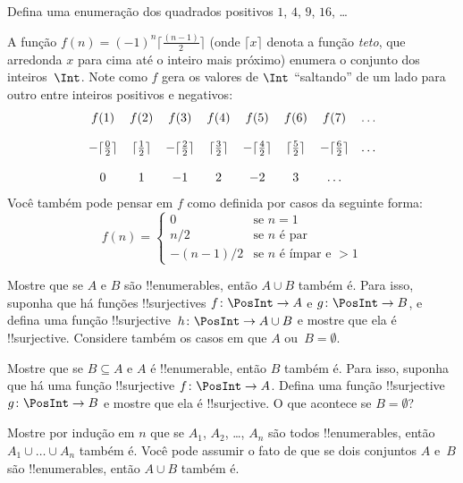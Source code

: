 \documentclass[../../../include/open-logic-section]{subfiles}
\begin{document}
\begin{prob}
Defina uma enumeração dos quadrados positivos $1$, $4$, $9$, $16$, \dots
\end{prob}

\begin{ex}
A função $f(n) = (-1)^{n} \lceil \frac{(n-1)}{2}\rceil$ (onde
$\lceil x \rceil$ denota a função \emph{teto}, que arredonda
$x$ para cima até o inteiro mais próximo) enumera o conjunto dos
inteiros~$\Int$. Note como $f$ gera os valores de $\Int$
``saltando'' de um lado para outro entre inteiros positivos e negativos:
\[
\begin{array}{c c c c c c c c}
f(1) & f(2) & f(3) & f(4) & f(5) & f(6) & f(7) & \dots \\ \\
- \lceil \tfrac{0}{2} \rceil & \lceil \tfrac{1}{2}\rceil & - \lceil \tfrac{2}{2} \rceil & \lceil \tfrac{3}{2} \rceil & - \lceil \tfrac{4}{2} \rceil  & \lceil \tfrac{5}{2}
\rceil & - \lceil \tfrac{6}{2} \rceil & \dots \\ \\
0 & 1 & -1 & 2 & -2 & 3 & \dots
\end{array}
\]
Você também pode pensar em $f$ como definida por casos da seguinte forma:
\[
f(n) = \begin{cases}
  0 & \text{se $n = 1$}\\
  n/2 & \text{se $n$ é par}\\
  -(n-1)/2 & \text{se $n$ é ímpar e $>1$}
  \end{cases}
\]
\end{ex}

\begin{prob}
  Mostre que se $A$ e $B$ são !!{enumerable}s, então $A \cup B$ também é. Para
  isso, suponha que há funções !!{surjective}s $f\colon \PosInt \to
  A$ e $g\colon \PosInt \to B$, e defina uma função
  !!{surjective}~$h\colon \PosInt \to A \cup B$ e mostre que ela é
  !!{surjective}. Considere também os casos em que $A$ ou~$B = \emptyset$.
\end{prob}

\begin{prob}
  Mostre que se $B \subseteq A$ e $A$ é !!{enumerable}, então $B$ também é. Para
  isso, suponha que há uma função !!{surjective} $f\colon \PosInt \to
  A$. Defina uma função !!{surjective}~$g\colon \PosInt \to B$ e mostre
  que ela é !!{surjective}. O que acontece se $B = \emptyset$?
\end{prob}

\begin{prob}
  Mostre por indução em $n$ que se $A_1$, $A_2$, \dots, $A_n$ são todos
  !!{enumerable}s, então $A_1 \cup \dots \cup A_n$ também é. Você pode assumir o
  fato de que se dois conjuntos $A$ e~$B$ são !!{enumerable}s, então $A \cup
  B$ também é.
\end{prob}
\end{document}
